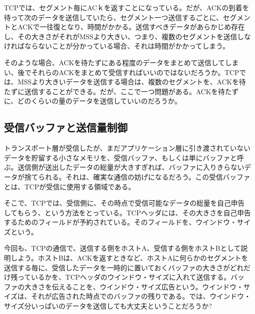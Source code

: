 TCPでは、セグメント毎にACｋを返すことになっている。だが、ACKの到着を待って次のデータを送信していたら、セグメント一つ送信するごとに、セグメントとACKで一往復となり、時間がかかる。送信すべきデータがあらかじめ存在し、その大きさがそれがMSSより大きい、つまり、複数のセグメントを送信しなければならないことが分かっている場合、それは時間がかかってしまう。

そのような場合、ACKを待たずにある程度のデータをまとめて送信してしまい、後でそれらのACKをまとめて受信すればいいのではないだろうか。TCPでは、MSSより大きいデータを送信する場合は、複数のセグメントを、ACKを待たずに送信することができる。だが、ここで一つ問題がある。ACKを待たずに、どのくらいの量のデータを送信していいのだろうか。

\subsection{受信バッファと送信量制御}

トランスポート層が受信したが、まだアプリケーション層に引き渡されていないデータを貯留する小さなメモリを、受信バッファ、もしくは単にバッファと呼ぶ。送信側が送出したデータの総量が大きすぎれば、バッファに入りきらないデータが捨てられる。それは、確実な通信の妨げになるだろう。この受信バッファとは、TCPが受信に使用する領域である。

そこで、TCPでは、受信側に、その時点で受信可能なデータの総量を自己申告してもらう、という方法をとっている。TCPヘッダには、その大きさを自己申告するためのフィールドが予約されている。そのフィールドを、ウインドウ・サイズという。

今回も、TCPの通信で、送信する側をホストA、受信する側をホストBとして説明しよう。ホストBは、ACKを返すときなど、ホストAに何らかのセグメントを送信する毎に、受信したデータを一時的に置いておくバッファの大きさがどれだけ残っているかを、TCPヘッダのウインドウ・サイズに入れて送信する。バッファの大きさを伝えることを、ウインドウ・サイズ広告という。ウインドウ・サイズは、それが広告された時点でのバッファの残りである。では、ウインドウ・サイズ分いっぱいのデータを送信しても大丈夫ということだろうか?

